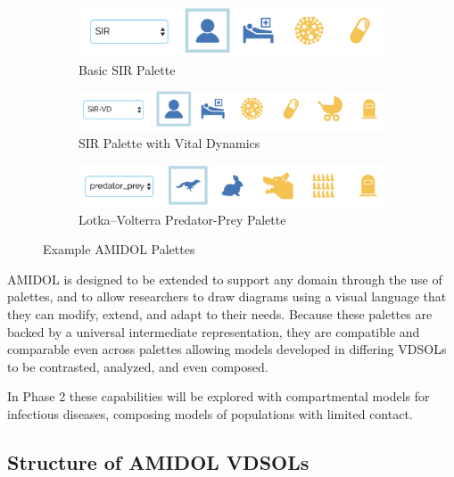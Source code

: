 \documentclass[11pt]{article}
\newcommand{\amidol}{\textsc{AMIDOL}}
\begin{document}
\begin{figure}
  \begin{subfigure}[b]{\textwidth}
    \includegraphics[width=\textwidth]{figs/SIR-palette.png}
    \caption{Basic SIR Palette}
    \label{Fig:SIRPalette}
  \end{subfigure}
  \begin{subfigure}[b]{\textwidth}
    \includegraphics[width=\textwidth]{figs/SIR-VD-palette.png}
    \caption{SIR Palette with Vital Dynamics}
    \label{Fig:SIRVDPalette}
  \end{subfigure}
  \begin{subfigure}[b]{\textwidth}
    \includegraphics[width=\textwidth]{figs/PREDPREY-palette.png}
    \caption{Lotka–Volterra Predator-Prey Palette}
    \label{Fig:PREDPREYPalette}    
  \end{subfigure}
  \caption{Example \amidol{} Palettes}
  \label{Fig:Palettes}
\end{figure}

\amidol{} is designed to be extended to support any domain through the use of palettes, and to allow researchers to draw diagrams using a visual language that they can modify, extend, and adapt to their needs.  Because these palettes are backed by a universal intermediate representation, they are compatible and comparable even across palettes allowing models developed in differing VDSOLs to be contrasted, analyzed, and even composed.

In Phase 2 these capabilities will be explored with compartmental models for infectious diseases, composing models of populations with limited contact.

\subsection{Structure of \amidol{} VDSOLs}
\end{document}
